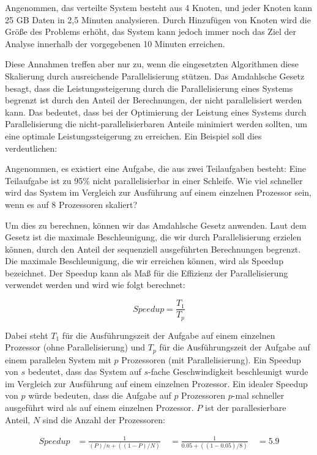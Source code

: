 \documentclass[../vs-script-first-v01.tex]{subfiles}
\begin{document}
\begin{itemize}
Angenommen, das verteilte System besteht aus 4 Knoten, und jeder Knoten kann 25 GB Daten in 2,5 Minuten analysieren. Durch Hinzufügen von Knoten wird die Größe des Problems erhöht, das System kann jedoch immer noch das Ziel der Analyse innerhalb der vorgegebenen 10 Minuten erreichen.

Diese Annahmen treffen aber nur zu, wenn die eingesetzten Algorithmen diese Skalierung durch ausreichende Parallelisierung stützen. Das Amdahlsche Gesetz~\cite{amdahl1967validity} besagt, dass die Leistungssteigerung durch die Parallelisierung eines Systems begrenzt ist durch den Anteil der Berechnungen, der nicht parallelisiert werden kann. Das bedeutet, dass bei der Optimierung der Leistung eines Systems durch Parallelisierung die nicht-parallelisierbaren Anteile minimiert werden sollten, um eine optimale Leistungssteigerung zu erreichen. Ein Beispiel soll dies verdeutlichen:

Angenommen, es existiert eine Aufgabe, die aus zwei Teilaufgaben besteht: Eine Teilaufgabe ist zu 95\% nicht parallelisierbar in einer Schleife. Wie viel schneller wird das System im Vergleich zur Ausführung auf einem einzelnen Prozessor sein, wenn es auf 8 Prozessoren skaliert?

Um dies zu berechnen, können wir das Amdahlsche Gesetz anwenden. Laut dem Gesetz ist die maximale Beschleunigung, die wir durch Parallelisierung erzielen können, durch den Anteil der sequenziell ausgeführten Berechnungen begrenzt. 
Die maximale Beschleunigung, die wir erreichen können, wird als Speedup bezeichnet. Der Speedup kann als Maß für die Effizienz der Parallelisierung verwendet werden und wird wie folgt berechnet:

\begin{equation*}
Speedup = \frac{T_1}{T_p}
\end{equation*}

Dabei steht $T_1$ für die Ausführungszeit der Aufgabe auf einem einzelnen Prozessor (ohne Parallelisierung) und $T_p$ für die Ausführungszeit der Aufgabe auf einem parallelen System mit $p$ Prozessoren (mit Parallelisierung). Ein Speedup von $s$ bedeutet, dass das System auf $s$-fache Geschwindigkeit beschleunigt wurde im Vergleich zur Ausführung auf einem einzelnen Prozessor. Ein idealer Speedup von $p$ würde bedeuten, dass die Aufgabe auf $p$ Prozessoren $p$-mal schneller ausgeführt wird als auf einem einzelnen Prozessor. $P$ ist der parallesierbare Anteil, $N$ sind die Anzahl der Prozessoren:

\begin{align*}
Speedup &= \frac{1}{(P)/n + ((1 - P)/N)} \
&= \frac{1}{0.05 + ((1 - 0.05)/8)} \
&= 5.9
\end{align*}


\end{itemize}
\end{document}
